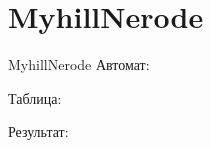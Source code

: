 \section{MyhillNerode}
\begin{frame}{MyhillNerode}
	Автомат:


	Таблица:


	Результат:

\end{frame}
